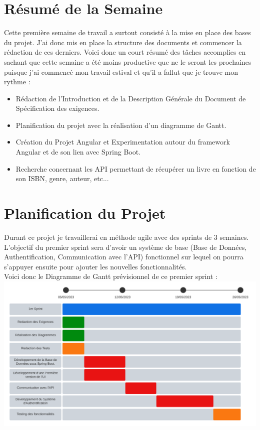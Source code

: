 \documentclass[a4paper, 12pt]{article}
\begin{document}
    \tableofcontents

    \newpage
    \section{Résumé de la Semaine}
    Cette première semaine de travail a surtout consisté à la mise en place des bases du projet.
    J'ai donc mis en place la structure des documents et commencer la rédaction de ces derniers. 
    Voici donc un court résumé des tâches accomplies en sachant que cette semaine a été moins productive que ne le seront les prochaines puisque j'ai commencé mon travail estival et qu'il a fallut que je trouve mon rythme :
    \begin{itemize}
        \item Rédaction de l'Introduction et de la Description Générale du Document de Spécification des exigences.
        \item Planification du projet avec la réalisation d'un diagramme de Gantt.
        \item Création du Projet Angular et Experimentation autour du framework Angular et de son lien avec Spring Boot.
        \item Recherche concernant les API permettant de récupérer un livre en fonction de son ISBN, genre, auteur, etc...
    \end{itemize}

    \section{Planification du Projet}
    Durant ce projet je travaillerai en méthode agile avec des sprints de 3 semaines. L'objectif du premier sprint sera d'avoir un système de base (Base de Données, Authentification, Communication avec l'API) fonctionnel sur lequel on pourra s'appuyer ensuite pour ajouter les nouvelles fonctionnalités.
    \\
    Voici donc le Diagramme de Gantt prévisionnel de ce premier sprint :
    \\
    \includegraphics[scale=0.6]{Diagramme de Gantt Sprint 1.png}
\end{document}
